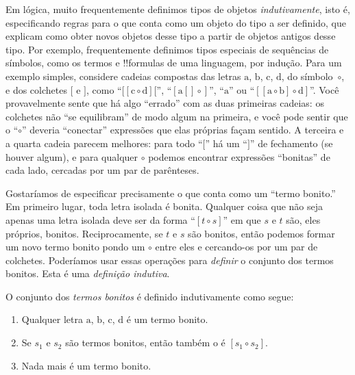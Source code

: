 \documentclass[../../../include/open-logic-section]{subfiles}
\begin{document}


Em lógica, muito frequentemente definimos tipos de objetos \emph{indutivamente},
isto é, especificando regras para o que conta como um objeto do tipo a
ser definido, que explicam como obter novos objetos desse tipo a partir de objetos
antigos desse tipo.  Por exemplo, frequentemente definimos tipos especiais de
sequências de símbolos, como os termos e !!{formula}s de uma
linguagem, por indução.  Para um exemplo simples, considere cadeias
compostas das letras $\mathrm{a}$, $\mathrm{b}$, $\mathrm{c}$,
$\mathrm{d}$, do símbolo~$\circ$, e dos colchetes $[$ e $]$, como
``$[[\mathrm{c} \circ \mathrm{d}][$'', ``$[\mathrm{a}[]\circ]$'',
``$\mathrm{a}$'' ou ``$[[\mathrm{a} \circ \mathrm{b}]\circ
\mathrm{d}]$''.  Você provavelmente sente que há algo
``errado'' com as duas primeiras cadeias: os colchetes não
``se equilibram'' de modo algum na primeira, e você pode sentir que o
``$\circ$'' deveria ``conectar'' expressões que elas próprias façam
sentido. A terceira e a quarta cadeia parecem melhores: para todo ``$[$''
há um ``$]$'' de fechamento (se houver algum), e para qualquer
$\circ$ podemos encontrar expressões ``bonitas'' de cada lado,
cercadas por um par de parênteses.

Gostaríamos de especificar precisamente o que conta como um ``termo bonito.''
Em primeiro lugar, toda letra isolada é bonita.  Qualquer coisa que não
seja apenas uma letra isolada deve ser da forma ``$[t \circ s]$'' em que
$s$ e $t$ são, eles próprios, bonitos. Reciprocamente, se $t$ e $s$ são bonitos,
então podemos formar um novo termo bonito pondo um $\circ$ entre eles e
cercando-os por um par de colchetes.  Poderíamos usar essas operações
para \emph{definir} o conjunto dos termos bonitos.  Esta é uma \emph{definição
  indutiva}.

\begin{defn}
  O conjunto dos \emph{termos bonitos} é definido indutivamente como segue:
  \begin{enumerate}
  \item Qualquer letra $\mathrm{a}$, $\mathrm{b}$, $\mathrm{c}$,
    $\mathrm{d}$ é um termo bonito.
  \item Se $s_1$ e $s_2$ são termos bonitos, então também o
    é $[s_1 \circ s_2]$.
  \item Nada mais é um termo bonito.
  \end{enumerate}
\end{defn}
\end{document}
